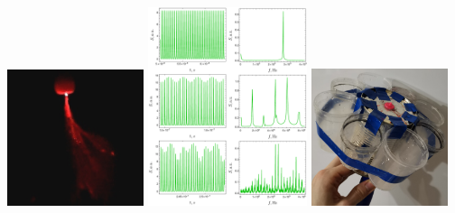 \begin{center}
	\includegraphics[width=0.3\textwidth]{figures/photo3.jpg}
	\hfill
	\includegraphics[width=0.35\textwidth]{figures/modeling_vertical.pdf}
	\hfill
	\includegraphics[width=0.3\textwidth]{images/equipment.png}	
\end{center}



